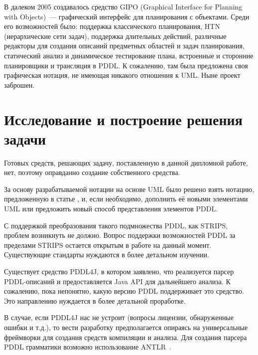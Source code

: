 \documentclass[a4paper,14pt]{extreport}
\begin{document}
    В далеком 2005 создавалось средство GIPO (Graphical Interface for Planning with Objects)~--- графический интерфейс для планирования с объектами. Среди его возможностей было: поддержка классического планирования, HTN (иерархические  сети задач), поддержка длительных действий, различные редакторы для создания описаний предметных областей и задач планирования, статический анализ и динамическое тестирование плана, встроенные и сторонние планировщики и трансляция в PDDL. К сожалению, там была предложена своя графическая нотация, не имеющая никакого отношения к UML. Ныне проект заброшен.   
    
\section*{Исследование и построение решения задачи}
   
    Готовых средств, решающих задачу, поставленную в данной дипломной работе, нет, поэтому оправданно создание собственного средства. 

    За основу разрабатываемой нотации на основе UML было решено взять нотацию, предложенную в статье \cite{mal-manz}, и, если необходимо, дополнить её новыми элементами UML или предложить новый способ представления элементов PDDL. 

    С поддержкой преобразования такого подмножества PDDL, как STRIPS, проблем возникнуть не должно. Вопрос поддержки возможностей PDDL за пределами STRIPS остается открытым в работе на данный момент. Существующие стандарты нуждаются в более детальном изучении.

    Существует средство PDDL4J, в котором заявлено, что реализуется парсер PDDL-описаний и предоставляется Java API для дальнейшего анализа. К сожалению, пока непонятно, какую версию PDDL поддерживает это средство. Это направлению нуждается в более детальной проработке.
     
    В случае, если PDDL4J нас не устроит (вопросы лицензии, обнаруженные ошибки и т.д.), то вести разработку предполагается опираясь на универсальные фреймворки для создания средств компиляции и анализа. Для создания парсера PDDL грамматики возможно использование ANTLR~\cite{antlr}. 
    
    
\end{document}
